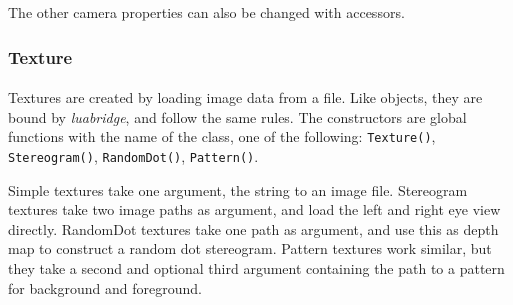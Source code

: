 The other camera properties can also be changed with accessors.

\subsubsection{Texture}
\paragraph{}
Textures are created by loading image data from a file.
Like objects, they are bound by \textit{luabridge}, and follow the same rules.
The constructors are global functions with the name of the class, one of the following:
\texttt{Texture()}, \texttt{Stereogram()}, \texttt{RandomDot()}, \texttt{Pattern()}.

Simple textures take one argument, the string to an image file.
Stereogram textures take two image paths as argument, and load the left and right eye view directly.
RandomDot textures take one path as argument, and use this as depth map to construct a random dot stereogram.
Pattern textures work similar, but they take a second and optional third argument containing the path to a pattern for background and foreground.

